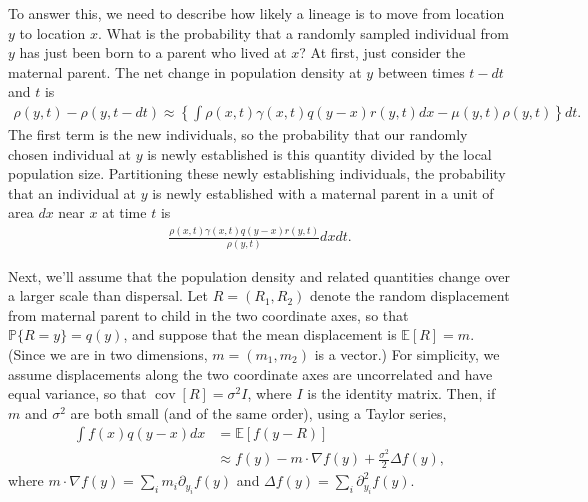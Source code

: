 \documentclass{article}
\renewcommand{\P}{\mathbb{P}}
\newcommand{\E}{\mathbb{E}}
\DeclareMathOperator{\cov}{cov}
\newcommand{\grad}{\nabla}
\newcommand{\details}[1]{\relax}
\begin{document}
To answer this, we need to describe how likely a lineage is to move from location $y$ to location $x$.
What is the probability that a randomly sampled individual from $y$
has just been born to a parent who lived at $x$?
At first, just consider the maternal parent.
The net change in population density at $y$ between times $t - dt$ and $t$ is
\begin{align*}
    \rho(y, t) - \rho(y, t - dt)
    \approx
    \left\{
        \int \rho(x, t) \gamma(x, t) q(y - x) r(y, t) dx - \mu(y, t) \rho(y, t) 
    \right\} dt .
\end{align*}
The first term is the new individuals,
so the probability that our randomly chosen individual at $y$ is newly established is
this quantity divided by the local population size.
Partitioning these newly establishing individuals,
the probability that an individual at $y$ is newly established
with a maternal parent in a unit of area $dx$ near $x$ at time $t$ is
\begin{align} \label{eqn:jump_intro}
    \frac{
        \rho(x, t) \gamma(x, t) q(y - x) r(y, t)
    }{ \rho(y, t) } dx dt .
\end{align}

Next, we'll assume that the population density and related quantities
change over a larger scale than dispersal.
Let $R = (R_1, R_2)$ denote the random displacement from maternal parent to child
in the two coordinate axes,
so that $\P\{R = y\} = q(y)$,
and suppose that the mean displacement is $\E[R] = m$.
(Since we are in two dimensions, $m = (m_1, m_2)$ is a vector.)
For simplicity, we assume displacements along the two coordinate axes 
are uncorrelated and have equal variance,
so that $\cov[R] = \sigma^2 I$, where $I$ is the identity matrix.
Then, if $m$ and $\sigma^2$ are both small (and of the same order),
using a Taylor series,
\begin{align} \label{eqn:taylor}
    \int f(x) q(y - x) dx %
    &= \E[f(y - R)] \\  %
    &\approx f(y) - m \cdot \grad f(y) + \frac{\sigma^2}{2} \Delta f(y) ,
\end{align}
where $m \cdot \grad f(y) = \sum_i m_i \partial_{y_i} f(y)$
and $\Delta f(y) = \sum_i \partial^2_{y_i} f(y)$.
\details{(There is also a term $\sum_{ij} m_i m_j \partial_{ij} f(y)$, but it is second-order in $m$.)}
\end{document}
